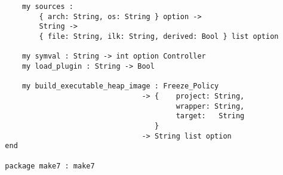 \begin{small}
\begin{verbatim}
      my sources :
          { arch: String, os: String } option ->
          String ->
          { file: String, ilk: String, derived: Bool } list option

      my symval : String -> int option Controller
      my load_plugin : String -> Bool

      my build_executable_heap_image : Freeze_Policy
                                  -> {    project: String,
                                          wrapper: String,
                                          target:   String
                                     }
                                  -> String list option
  end

  package make7 : make7
\end{verbatim}
\end{small}
